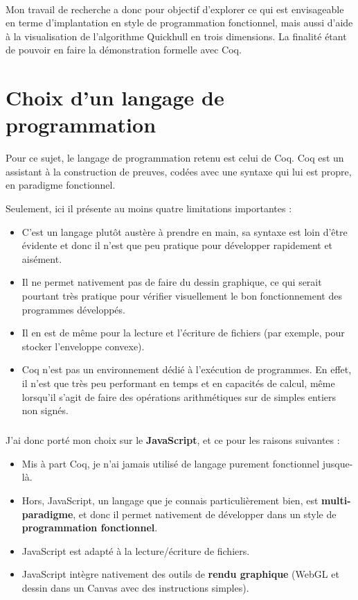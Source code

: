 \documentclass[]{article}
\begin{document}
\paragraph{}
Mon travail de recherche a donc pour objectif d'explorer ce qui est envisageable en terme d'implantation en style de programmation fonctionnel, mais aussi d'aide à la visualisation de l'algorithme Quickhull en trois dimensions. La finalité étant de pouvoir en faire la démonstration formelle avec Coq.

\section{Choix d'un langage de programmation}
Pour ce sujet, le langage de programmation retenu est celui de Coq. Coq est un assistant à la construction de preuves, codées avec une syntaxe qui lui est propre, en paradigme fonctionnel.

Seulement, ici il présente au moins quatre limitations importantes :
\begin{itemize}
	\item C'est un langage plutôt austère à prendre en main, sa syntaxe est loin d'être évidente et donc il n'est que peu pratique pour développer rapidement et aisément.
	\item Il ne permet nativement pas de faire du dessin graphique, ce qui serait pourtant très pratique pour vérifier visuellement le bon fonctionnement des programmes développés.
	\item Il en est de même pour la lecture et l'écriture de fichiers (par exemple, pour stocker l'enveloppe convexe).
	\item Coq n'est pas un environnement dédié à l'exécution de programmes. En effet, il n'est que très peu performant en temps et en capacités de calcul, même lorsqu'il s'agit de faire des opérations arithmétiques sur de simples entiers non signés.
\end{itemize}

\subparagraph{}
J'ai donc porté mon choix sur le \textbf{JavaScript}, et ce pour les raisons suivantes :
\begin{itemize}
	\item Mis à part Coq, je n'ai jamais utilisé de langage purement fonctionnel jusque-là.
	\item Hors, JavaScript, un langage que je connais particulièrement bien, est \textbf{multi-paradigme}, et donc il permet nativement de développer dans un style de \textbf{programmation fonctionnel}.
	\item JavaScript est adapté à la lecture/écriture de fichiers.
	\item JavaScript intègre nativement des outils de \textbf{rendu graphique} (WebGL et dessin dans un Canvas avec des instructions simples).
\end{itemize}
\end{document}
